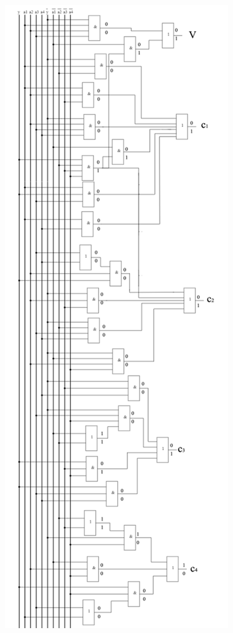 \documentclass{article}
\begin{document}
\begin{enumerate}
\begin{center}
       \includegraphics[scale=0.85]{rr.png}
\end{center}


       \end{enumerate}
\end{document}
